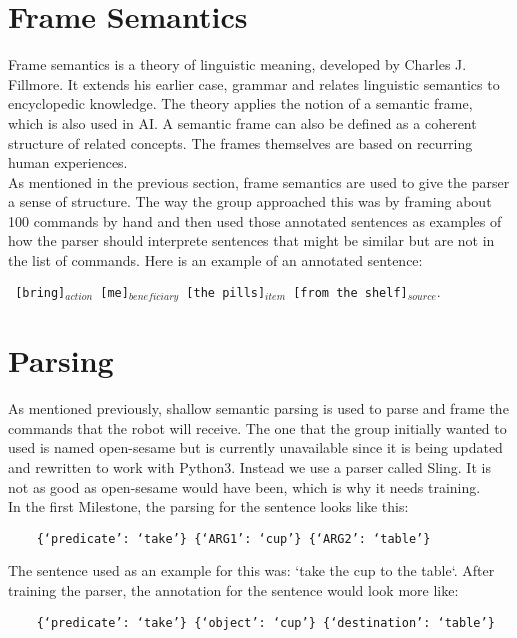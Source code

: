 \documentclass[main.tex]{subfiles}
\begin{document}
	
	\section{Frame Semantics}
	Frame semantics is a theory of linguistic meaning, developed by Charles J. Fillmore. It extends his earlier case, grammar and relates linguistic semantics to encyclopedic knowledge. The theory applies the notion of a semantic frame, which is also used in AI. A semantic frame can also be defined as a coherent structure of related concepts. The frames themselves are based on recurring human experiences.\\
	As mentioned in the previous section, frame semantics are used to give the parser a sense of structure. The way the group approached this was by framing about 100 commands by hand and then used those annotated sentences as examples of how the parser should interprete sentences that might be similar but are not in the list of commands. 
	Here is an example of an annotated sentence: 

	\texttt{ [bring]$_{action}$  [me]$_{beneficiary}$ [the pills]$_{item}$ [from the shelf]$_{source}.$}
	
	\section{Parsing}
	As mentioned previously, shallow semantic parsing is used to parse and frame the commands that the robot will receive. The one that the group initially wanted to used is named open-sesame but is currently unavailable since it is being updated and rewritten to work with Python3. Instead we use a parser called Sling. It is not as good as open-sesame would have been, which is why it needs training.\\ 
	In the first Milestone, the parsing for the sentence looks like this:

	\begin{verbatim}
	{‘predicate’: ‘take’} {‘ARG1’: ‘cup’} {‘ARG2’: ‘table’}
	\end{verbatim}

	The sentence used as an example for this was: ‘take the cup to the table‘. After training the parser, the annotation for the sentence would look more like:

	\begin{verbatim}
	{‘predicate’: ‘take’} {‘object’: ‘cup’} {‘destination’: ‘table’}
	\end{verbatim}
	
\end{document}
